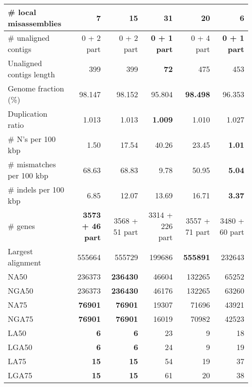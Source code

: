 \documentclass[12pt,a4paper]{article}
\begin{document}
\begin{table}[ht]
\begin{center}
\begin{tabular}{|l*{5}{|r}|}
\# local misassemblies & 7 & 15 & 31 & 20 & {\bf 6} \\ \hline
\# unaligned contigs & 0 + 2 part & 0 + 2 part & {\bf 0 + 1 part} & 0 + 4 part & {\bf 0 + 1 part} \\ \hline
Unaligned contigs length & 399 & 399 & {\bf 72} & 475 & 453 \\ \hline
Genome fraction (\%) & 98.147 & 98.152 & 95.804 & {\bf 98.498} & 96.353 \\ \hline
Duplication ratio & 1.013 & 1.013 & {\bf 1.009} & 1.010 & 1.027 \\ \hline
\# N's per 100 kbp & 1.50 & 17.54 & 40.26 & 23.45 & {\bf 1.01} \\ \hline
\# mismatches per 100 kbp & 68.63 & 68.83 & 9.78 & 50.95 & {\bf 5.04} \\ \hline
\# indels per 100 kbp & 6.85 & 12.07 & 13.69 & 16.71 & {\bf 3.37} \\ \hline
\# genes & {\bf 3573 + 46 part} & 3568 + 51 part & 3314 + 226 part & 3557 + 71 part & 3480 + 60 part \\ \hline
Largest alignment & 555664 & 555729 & 199686 & {\bf 555891} & 232643 \\ \hline
NA50 & 236373 & {\bf 236430} & 46604 & 132265 & 65252 \\ \hline
NGA50 & 236373 & {\bf 236430} & 46176 & 132265 & 63260 \\ \hline
NA75 & {\bf 76901} & {\bf 76901} & 19307 & 71696 & 43921 \\ \hline
NGA75 & {\bf 76901} & {\bf 76901} & 16019 & 70982 & 42523 \\ \hline
LA50 & {\bf 6} & {\bf 6} & 23 & 9 & 18 \\ \hline
LGA50 & {\bf 6} & {\bf 6} & 24 & 9 & 19 \\ \hline
LA75 & {\bf 15} & {\bf 15} & 54 & 19 & 37 \\ \hline
LGA75 & {\bf 15} & {\bf 15} & 61 & 20 & 38 \\ \hline
\end{tabular}
\end{center}
\end{table}
\end{document}
